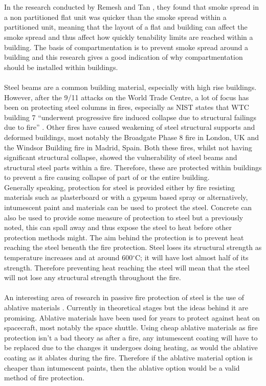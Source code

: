 \documentclass[table,a4paper,oneside]{book}
\newcommand{\degree}{\ensuremath{^\circ}} %
\begin{document}
\\
\\
In the research conducted by Remesh and Tan \citep{K.Remesh09012006}, they found that smoke spread in a non partitioned flat unit was quicker than the smoke spread within a partitioned unit, meaning that the layout of a flat and building can affect the smoke spread and thus affect how quickly tenability limits are reached within a building. The basis of compartmentation is to prevent smoke spread around a building and this research gives a good indication of why compartmentation should be installed within buildings.
\\
\\
Steel beams are a common building material, especially with high rise buildings. However, after the 9\slash11 attacks on the World Trade Centre, a lot of focus has been on protecting steel columns in fires, especially as NIST states that WTC building 7 ``underwent progressive fire induced collapse due to structural failings due to fire'' \citep{NIST2008}. Other fires have caused weakening of steel structural supports and deformed buildings, most notably the Broadgate Phase 8 fire in London, UK and the Windsor Building fire in Madrid, Spain. Both these fires, whilst not having significant structural collapse, showed the vulnerability of steel beams and structural steel parts within a fire. Therefore, these are protected within buildings to prevent a fire causing collapse of part of or the entire building.
\\
Generally speaking, protection for steel is provided either by fire resisting materials such as plasterboard or with a gypsum based spray or alternatively, intumescent paint and materials can be used to protect the steel. Concrete can also be used to provide some measure of protection to steel but a previously noted, this can spall away and thus expose the steel to heat before other protection methods might. The aim behind the protection is to prevent heat reaching the steel beneath the fire protection. Steel loses its structural strength as temperature increases and at around 600\degree C; it will have lost almost half of its strength. Therefore preventing heat reaching the steel will mean that the steel will not lose any structural strength throughout the fire.
\\
\\
An interesting area of research in passive fire protection of steel is the use of ablative materials \citep{Staggs2008618}. Currently in theoretical stages but the ideas behind it are promising. Ablative materials have been used for years to protect against heat on spacecraft, most notably the space shuttle. Using cheap ablative materials as fire protection isn't a bad theory as after a fire, any intumescent coating will have to be replaced due to the changes it undergoes doing heating, as would the ablative coating as it ablates during the fire. Therefore if the ablative material option is cheaper than intumescent paints, then the ablative option would be a valid method of fire protection.
\end{document}
